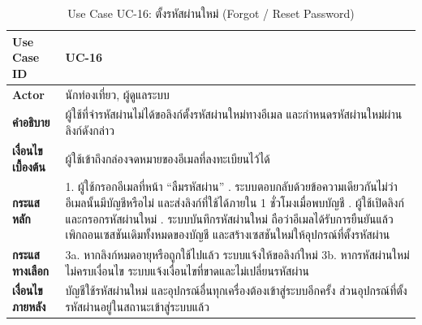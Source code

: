 \begin{table}[H]
\centering
\caption{Use Case UC-16: ตั้งรหัสผ่านใหม่ (Forgot / Reset Password)}
\label{tab:uc16}
\begin{tabular}{|p{3.2cm}|p{10cm}|}
\hline
\textbf{Use Case ID} & UC-16 \\ \hline
\textbf{Actor} & นักท่องเที่ยว, ผู้ดูแลระบบ \\ \hline
\textbf{คำอธิบาย} & ผู้ใช้ที่จำรหัสผ่านไม่ได้ขอลิงก์ตั้งรหัสผ่านใหม่ทางอีเมล และกำหนดรหัสผ่านใหม่ผ่านลิงก์ดังกล่าว \\ \hline
\textbf{เงื่อนไขเบื้องต้น} & ผู้ใช้เข้าถึงกล่องจดหมายของอีเมลที่ลงทะเบียนไว้ได้ \\ \hline
\textbf{กระแสหลัก} & 1. ผู้ใช้กรอกอีเมลที่หน้า ``ลืมรหัสผ่าน'' \newline 2. ระบบตอบกลับด้วยข้อความเดียวกันไม่ว่าอีเมลนั้นมีบัญชีหรือไม่ และส่งลิงก์ที่ใช้ได้ภายใน 1 ชั่วโมงเมื่อพบบัญชี \newline 3. ผู้ใช้เปิดลิงก์และกรอกรหัสผ่านใหม่ \newline 4. ระบบบันทึกรหัสผ่านใหม่ ถือว่าอีเมลได้รับการยืนยันแล้ว เพิกถอนเซสชันเดิมทั้งหมดของบัญชี และสร้างเซสชันใหม่ให้อุปกรณ์ที่ตั้งรหัสผ่าน \\ \hline
\textbf{กระแสทางเลือก} & 3a. หากลิงก์หมดอายุหรือถูกใช้ไปแล้ว ระบบแจ้งให้ขอลิงก์ใหม่ \newline 3b. หากรหัสผ่านใหม่ไม่ครบเงื่อนไข ระบบแจ้งเงื่อนไขที่ขาดและไม่เปลี่ยนรหัสผ่าน \\ \hline
\textbf{เงื่อนไขภายหลัง} & บัญชีใช้รหัสผ่านใหม่ และอุปกรณ์อื่นทุกเครื่องต้องเข้าสู่ระบบอีกครั้ง ส่วนอุปกรณ์ที่ตั้งรหัสผ่านอยู่ในสถานะเข้าสู่ระบบแล้ว \\
\hline
\end{tabular}
\end{table}


